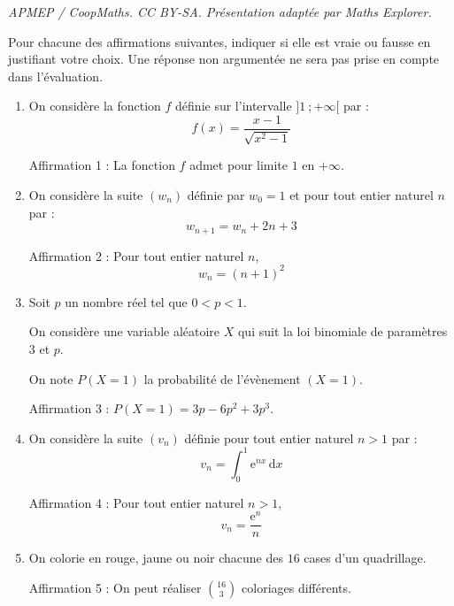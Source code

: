\documentclass[10pt]{article}
\providecommand{\e}{{\mathrm{e}}}
\renewcommand{\d}{{\mathrm{d}}}
\begin{document}
\noindent\textit{APMEP / CoopMaths. CC BY-SA. Présentation adaptée par Maths Explorer.}\par\medskip
Pour chacune des affirmations suivantes, indiquer si elle est vraie ou fausse en justifiant votre choix.
Une réponse non argumentée ne sera pas prise en compte dans l'évaluation.

\begin{enumerate}
\item On considère la fonction $f$ définie sur l'intervalle $]1~;+\infty[$ par :
\[
f(x)=\dfrac{x-1}{\sqrt{x^2-1}}
\]

Affirmation 1 : La fonction $f$ admet pour limite $1$ en $+\infty$.

\item On considère la suite $\left(w_n\right)$ définie par $w_0 = 1$ et pour tout entier naturel $n$ par :
\[
w_{n+1}=w_n+2n+3
\]

Affirmation 2 : Pour tout entier naturel $n$,
\[
w_n=(n+1)^2
\]

\item Soit $p$ un nombre réel tel que $0 < p < 1$.

On considère une variable aléatoire $X$ qui suit la loi binomiale de paramètres $3$ et $p$.

On note $P\left(X=1\right)$ la probabilité de l'évènement $(X=1)$.

Affirmation 3 : $P\left(X=1\right)=3p-6p^2+3p^3$.

\item On considère la suite $\left(v_n\right)$ définie pour tout entier naturel $n > 1$ par :
\[
v_n=\int_0^1 \e^{nx}\,\d x
\]

Affirmation 4 : Pour tout entier naturel $n > 1$,
\[
v_n=\dfrac{\e^n}{n}
\]

\item On colorie en rouge, jaune ou noir chacune des $16$ cases d'un quadrillage.

Affirmation 5 : On peut réaliser $\binom{16}{3}$ coloriages différents.
\end{enumerate}
\end{document}
